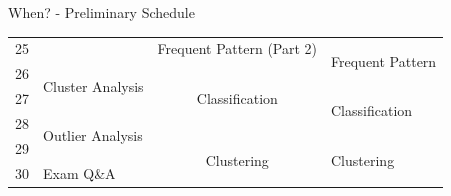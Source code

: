 \begin{frame}{When? - Preliminary Schedule}
\begin{tabular}{|p{4em}|p{15em}|p{9.5em}|p{9.5em}|p{10em}|}
		\cellcolor{faugray!25}25                    &                                   & \multicolumn{2}{|c|}{Frequent Pattern {\color{gray}(Part 2)}}                   & \multirow{2}{*}{\cellcolor{white}Frequent Pattern} \\ \hhline{|-|-|--|~|}
		\cellcolor{faugray!25}26                    & \multirow{2}{*}{Cluster Analysis} & \multicolumn{2}{|c|}{\multirow{3}{*}{Classification}}                           &                                                    \\ \hhline{|-|~|~~|-|}
		\cellcolor{faugray!25}27                    &                                   & \multicolumn{2}{|l|}{}                                                          & \multirow{2}{*}{\cellcolor{white}Classification}   \\ \hhline{|-|-|~~|~|}
		\cellcolor{faugray!25}28                    & \multirow{2}{*}{Outlier Analysis} & \multicolumn{2}{|l|}{}                                                          &                                                    \\ \hhline{|-|~|--|-|}
		\cellcolor{faugray!25}29                    &                                   & \multicolumn{2}{|c|}{\multirow{2}{*}{Clustering}}                               & \multirow{2}{*}{\cellcolor{white}Clustering}       \\ \hhline{|-|-|~~|~|}
		\cellcolor{faugray!25}30                    & Exam Q\&A                         & \multicolumn{2}{|l|}{}                                                          &                                                    \\ \hline
	\end{tabular}

\end{frame}

